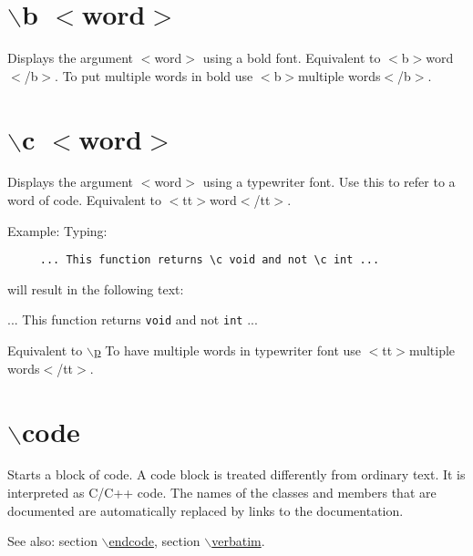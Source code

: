  \hypertarget{commands_cmdb}{}\section{$\backslash$b $<$word$>$}\label{commands_cmdb}
 Displays the argument $<$word$>$ using a bold font. Equivalent to $<$b$>$word$<$/b$>$. To put multiple words in bold use $<$b$>$multiple words$<$/b$>$.



 \hypertarget{commands_cmdc}{}\section{$\backslash$c $<$word$>$}\label{commands_cmdc}
 Displays the argument $<$word$>$ using a typewriter font. Use this to refer to a word of code. Equivalent to $<$tt$>$word$<$/tt$>$.

\begin{Desc}
\item[Example:]Typing: 

\footnotesize\begin{verbatim}
     ... This function returns \c void and not \c int ...
  \end{verbatim}
\normalsize
 will result in the following text:\par
\par
 ... This function returns {\tt void} and not {\tt int} ...\end{Desc}
Equivalent to \hyperlink{commands_cmdp}{$\backslash$p} To have multiple words in typewriter font use $<$tt$>$multiple words$<$/tt$>$.



 \hypertarget{commands_cmdcode}{}\section{$\backslash$code}\label{commands_cmdcode}
 Starts a block of code. A code block is treated differently from ordinary text. It is interpreted as C/C++ code. The names of the classes and members that are documented are automatically replaced by links to the documentation.

\begin{Desc}
\item[See also:]section \hyperlink{commands_cmdendcode}{$\backslash$endcode}, section \hyperlink{commands_cmdverbatim}{$\backslash$verbatim}.\end{Desc}


